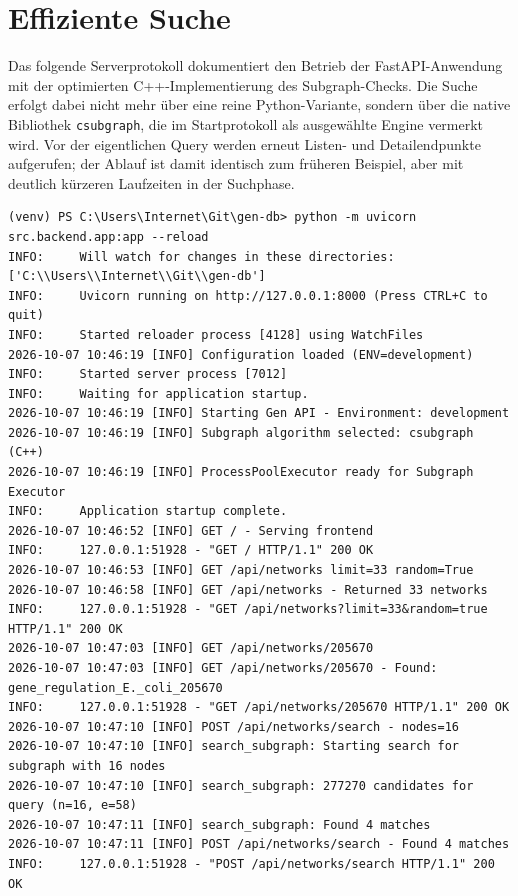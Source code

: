\documentclass[a4paper,12pt, twoside]{report}
\theoremstyle{definition}
\begin{document}
\section{Effiziente Suche}
\label{sec:effiziente-suche}

Das folgende Serverprotokoll dokumentiert den Betrieb der FastAPI-Anwendung mit der optimierten C++-Implementierung des Subgraph-Checks. Die Suche erfolgt dabei nicht mehr über eine reine Python-Variante, sondern über die native Bibliothek \texttt{csubgraph}, die im Startprotokoll als ausgewählte Engine vermerkt wird. Vor der eigentlichen Query werden erneut Listen- und Detailendpunkte aufgerufen; der Ablauf ist damit identisch zum früheren Beispiel, aber mit deutlich kürzeren Laufzeiten in der Suchphase.

\begin{lstlisting}[caption={Serverprotokoll zur schnellen Suche in Gen-DB}]
(venv) PS C:\Users\Internet\Git\gen-db> python -m uvicorn src.backend.app:app --reload
INFO:     Will watch for changes in these directories: ['C:\\Users\\Internet\\Git\\gen-db']
INFO:     Uvicorn running on http://127.0.0.1:8000 (Press CTRL+C to quit)
INFO:     Started reloader process [4128] using WatchFiles
2026-10-07 10:46:19 [INFO] Configuration loaded (ENV=development)
INFO:     Started server process [7012]
INFO:     Waiting for application startup.
2026-10-07 10:46:19 [INFO] Starting Gen API - Environment: development
2026-10-07 10:46:19 [INFO] Subgraph algorithm selected: csubgraph (C++)
2026-10-07 10:46:19 [INFO] ProcessPoolExecutor ready for Subgraph Executor
INFO:     Application startup complete.
2026-10-07 10:46:52 [INFO] GET / - Serving frontend
INFO:     127.0.0.1:51928 - "GET / HTTP/1.1" 200 OK
2026-10-07 10:46:53 [INFO] GET /api/networks limit=33 random=True
2026-10-07 10:46:58 [INFO] GET /api/networks - Returned 33 networks
INFO:     127.0.0.1:51928 - "GET /api/networks?limit=33&random=true HTTP/1.1" 200 OK
2026-10-07 10:47:03 [INFO] GET /api/networks/205670
2026-10-07 10:47:03 [INFO] GET /api/networks/205670 - Found: gene_regulation_E._coli_205670
INFO:     127.0.0.1:51928 - "GET /api/networks/205670 HTTP/1.1" 200 OK
2026-10-07 10:47:10 [INFO] POST /api/networks/search - nodes=16
2026-10-07 10:47:10 [INFO] search_subgraph: Starting search for subgraph with 16 nodes
2026-10-07 10:47:10 [INFO] search_subgraph: 277270 candidates for query (n=16, e=58)
2026-10-07 10:47:11 [INFO] search_subgraph: Found 4 matches
2026-10-07 10:47:11 [INFO] POST /api/networks/search - Found 4 matches
INFO:     127.0.0.1:51928 - "POST /api/networks/search HTTP/1.1" 200 OK
\end{lstlisting}
\end{document}
